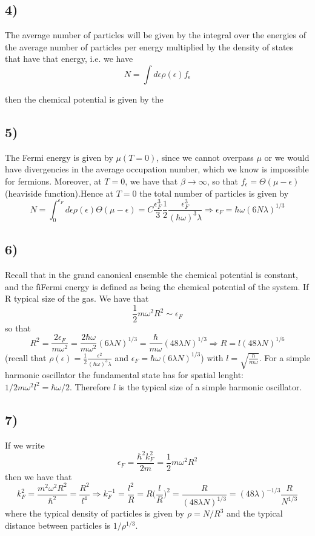 \documentclass[10pt,a4paper]{book}
\begin{document}
\subsection*{4)}
The average number of particles will be given by the integral over the energies of the average number of particles per energy multiplied by the density of states that have that energy, i.e. we have 
$$N=\int d\epsilon\rho(\epsilon) f_{\epsilon}$$

then the chemical potential is given by the 

\subsection*{5)}
The Fermi energy is given by $\mu(T=0)$, since we cannot overpass $\mu$ or we would have divergencies in the average occupation number, which we know is impossible for fermions. Moreover, at $T=0$, we have that $\beta\to\infty$, so that $f_{\epsilon}=\Theta(\mu-\epsilon)$ (heaviside function).Hence at $T=0$ the total number of particles is given by 
$$N=\int_0^{\epsilon_F}d\epsilon\rho(\epsilon)\Theta(\mu-\epsilon) =C\frac{\epsilon_F^3}{3}\frac{1}{2}\frac{\epsilon_F^3}{(\hbar\omega)^3\lambda}\Rightarrow \epsilon_F=\hbar\omega(6N\lambda)^{1/3}$$

\subsection*{6)}
Recall that in the grand canonical ensemble the chemical potential is constant, and the fìFermi energy is defined as being the chemical potential of the system. If R typical size of the gas. We have that
$$\frac{1}{2}m\omega^2R^2\sim\epsilon_F$$ so that
$$R^2=\frac{2\epsilon_F}{m\omega^2}=\frac{2\hbar\omega}{m\omega^2}(6\lambda N)^{1/3}=\frac{\hbar}{m\omega}(48\lambda N)^{1/3}\Rightarrow R=l(48\lambda N)^{1/6}$$ (recall that $\rho(\epsilon)=\frac{1}{2}\frac{\epsilon^2}{(\hbar\omega)^3\lambda}$ and $\epsilon_F=\hbar\omega(6\lambda N)^{1/3}$) with $l=\sqrt{\frac{\hbar}{m\omega}}$. For a simple harmonic oscillator the fundamental state has for spatial lenght: $1/2 m\omega^2 l^2=\hbar\omega/2$. Therefore $l$ is the typical size of a simple harmonic oscillator.

\subsection*{7)}
If we write $$\epsilon_F=\frac{\hbar^2k_F^2}{2m}=\frac{1}{2}m\omega^2 R^2$$ then we have that
$$k_F^2=\frac{m^2\omega^2 R^2}{\hbar^2}=\frac{R^2}{l^4}\Rightarrow k_F^{-1}=\frac{l^2}{R}=R\bigg(\frac{l}{R}\bigg)^2=\frac{R}{(48\lambda N)^{1/3}}={(48\lambda)^{-1/3}}\frac{R}{N^{1/3}}$$
 where the typical density of particles is given by $\rho=N/R^3$ and the typical distance between particles is $1/\rho^{1/3}$.
\end{document}
